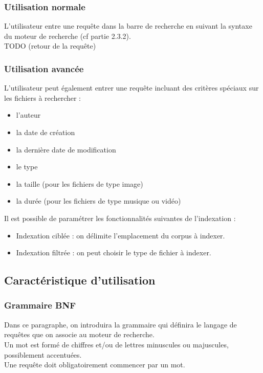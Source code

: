 \documentclass[a4paper,10pt]{article}
\begin{document}
\subsubsection{Utilisation normale}
L'utilisateur entre une requête dans la barre de recherche en suivant la syntaxe
du moteur de recherche (cf partie 2.3.2).\\
TODO (retour de la requête)


\subsubsection{Utilisation avancée}
L'utilisateur peut également entrer une requête incluant des critères spéciaux
sur les fichiers à rechercher :
\begin{itemize}
 \item l'auteur
 \item la date de création
 \item la dernière date de modification
 \item le type
 \item la taille (pour les fichiers de type image)
 \item la durée (pour les fichiers de type musique ou vidéo)
\end{itemize}
Il est possible de paramétrer les fonctionnalités suivantes de l'indexation :
\begin{itemize}
 \item Indexation ciblée : on délimite l'emplacement du corpus à indexer.
 \item Indexation filtrée : on peut choisir le type de fichier à indexer.
\end{itemize}


\subsection{Caractéristique d'utilisation}

\subsubsection{Grammaire BNF}
Dans ce paragraphe, on introduira la grammaire qui définira le langage de requêtes que on associe au moteur de recherche.\\

Un mot est formé de chiffres et/ou de lettres minuscules ou majuscules, possiblement accentuées.\\

Une requête doit obligatoirement commencer par un mot.\\
\end{document}
